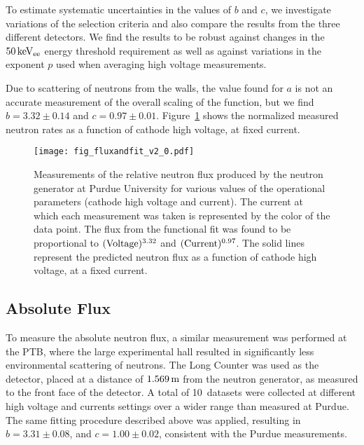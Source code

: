 To estimate systematic uncertainties in the values of $b$ and $c$, we investigate variations of the selection criteria and also compare the results from the three different detectors. We find the results to be robust against changes in the $50\, \mathrm{keV_{ee}}$ energy threshold requirement as well as against variations in the exponent $p$ used when averaging high voltage measurements.

Due to scattering of neutrons from the walls, the value found for $a$ is not an accurate measurement of the overall scaling of the function, but we find $b=3.32\pm0.14$ and $c=0.97\pm0.01$. Figure~\ref{fig:fluxandfit} shows the normalized measured neutron rates as a function of cathode high voltage, at fixed current.

\begin{figure}[!htbp]
\texttt{[image: fig\_fluxandfit\_v2\_0.pdf]}
\caption{Measurements of the relative neutron flux produced by the neutron generator at Purdue University for various values of the operational parameters (cathode high voltage and current). The current at which each measurement was taken is represented by the color of the data point. The flux from the functional fit was found to be proportional to $(\mathrm{Voltage})^{3.32}$ and $(\mathrm{Current})^{0.97}$. The solid lines represent the predicted neutron flux as a function of cathode high voltage, at a fixed current. }\label{fig:fluxandfit}
\end{figure}

\subsection{Absolute Flux}

To measure the absolute neutron flux, a similar measurement was performed at the PTB, where the large experimental hall resulted in significantly less environmental scattering of neutrons. The Long Counter was used as the detector, placed at a distance of $1.569\, \mathrm{m}$ from the neutron generator, as measured to the front face of the detector. A total of 10~datasets were collected at different high voltage and currents settings over a wider range than measured at Purdue. The same fitting procedure described above was applied, resulting in $b = 3.31 \pm 0.08$, and $c = 1.00 \pm 0.02$, consistent with the Purdue measurements.

